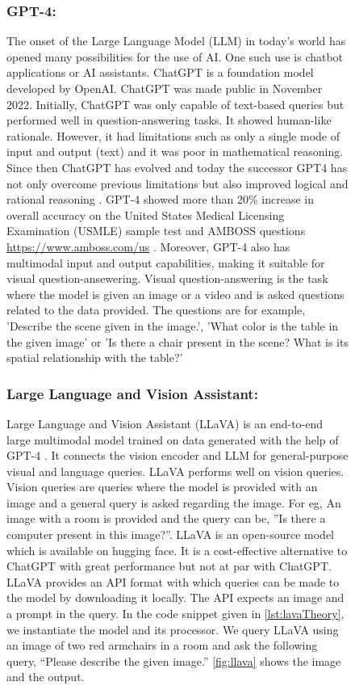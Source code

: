 \begin{figure}[ht!]
\subsubsection{GPT-4:}
The onset of the Large Language Model (LLM) in today's world has opened many possibilities for the use of AI. One such use is chatbot applications or AI
assistants. ChatGPT is a foundation model developed by OpenAI. ChatGPT was made public in November 2022. Initially, ChatGPT was only capable of 
text-based queries but performed well in question-answering tasks. It showed human-like rationale. However, it had limitations such as 
only a single mode of input and output (text) and it was poor in mathematical reasoning. Since then ChatGPT has evolved and today the successor 
GPT4 has not only overcome previous limitations but also improved logical and rational reasoning \cite{openai2024gpt4technicalreport}. GPT-4 showed more than 20\% increase in overall accuracy
on the  United States Medical Licensing Examination (USMLE) sample test and AMBOSS questions \url{https://www.amboss.com/us} \cite{Penny2024-qx}. Moreover, GPT-4 
also has multimodal input and output capabilities, making it suitable for visual question-ansewering. Visual question-answering is the task where
the model is given an image or a video and is asked questions related to the data provided. The questions are for example, 'Describe the scene given in 
the image.', 'What color is the table in the given image' or 'Is there a chair present in the scene? What is its spatial relationship with the table?'

\subsubsection{Large Language and Vision Assistant:}
 Large Language and Vision Assistant (LLaVA) is an end-to-end large multimodal model trained on data generated with the help of GPT-4 \cite{liu2023visualinstructiontuning}. 
 It connects the vision encoder and LLM for general-purpose visual and language queries. LLaVA performs well on vision queries. 
 Vision queries are queries where the model is provided with an image and a general query is asked regarding the image. 
 For eg, An image with a room is provided and the query can be, ”Is there a computer present in this image?”. LLaVA is an open-source model which is available on
 hugging face. It is a cost-effective alternative to ChatGPT with great performance but not at par with ChatGPT. LLaVA provides an API format with which queries can be made
 to the model by downloading it locally. The API expects an image and a prompt in the query. In the code snippet given in \cref{lst:lavaTheory}, we instantiate the model and its processor. We
 query LLaVA using an image of two red armchairs in a room and ask the following query, \enquote{Please describe the given image.} \cref{fig:llava} shows the image
 and the output.  



\end{figure}
